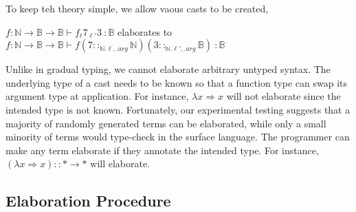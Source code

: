 To keep teh theory simple, we allow vaous casts to be created,
\begin{example}
$f:\mathbb{N}\rightarrow\mathbb{B}\rightarrow\mathbb{B}\vdash f_{\ell}7_{\ell'}3\ :\mathbb{B}$ elaborates to $f:\mathbb{N}\rightarrow\mathbb{B}\rightarrow\mathbb{B}\vdash f\left(7::_{\mathbb{N}.\ell,.arg}\mathbb{N}\right)\left(3::_{\mathbb{N}.\ell',.arg}\mathbb{B}\right)\ :\mathbb{B}$
\end{example}
 
 
Unlike in gradual typing, we cannot elaborate arbitrary untyped syntax.
The underlying type of a cast needs to be known so that a function type can swap its argument type at application.
For instance, $\lambda x\Rightarrow x$ will not elaborate since the intended type is not known.
Fortunately, our experimental testing suggests that a majority of randomly generated terms can be elaborated, while only a small minority of terms would type-check in the surface language.
The programmer can make any term elaborate if they annotate the intended type.
For instance, $\left(\lambda x\Rightarrow x\right)::*\rightarrow*$ will elaborate.
 
\subsection{Elaboration Procedure}
 

